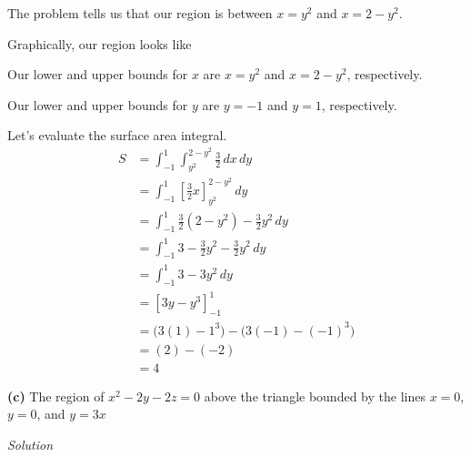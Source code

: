 \documentclass{article}
\newcommand{\lrp}[1]{\left( #1 \right)}
\newcommand{\lrb}[1]{\left[ #1 \right]}
\newcommand{\Solution}{\textit{Solution}}
\begin{document}
The problem tells us that our region is between $x=y^2$ and $x=2-y^2$.

Graphically, our region looks like \begin{center}
\end{center}

Our lower and upper bounds for $x$ are $x=y^2$ and $x=2-y^2$, respectively.

Our lower and upper bounds for $y$ are $y=-1$ and $y=1$, respectively.

Let's evaluate the surface area integral.
\begin{align*}
    S&=\int_{-1}^1\int_{y^2}^{2-y^2}\frac{3}{2}\,dx\,dy\\
    &=\int_{-1}^1\lrb{\frac{3}{2}x}_{y^2}^{2-y^2}\,dy\\
    &=\int_{-1}^1\frac{3}{2}\lrp{2-y^2}-\frac{3}{2}y^2\,dy\\
    &=\int_{-1}^1 3-\frac{3}{2}y^2-\frac{3}{2}y^2\,dy\\
    &=\int_{-1}^1 3-3y^2\,dy\\
    &=\lrb{3y-y^3}_{-1}^1\\
    &=\big(3(1)-1^3\big)-\big(3(-1)-(-1)^3\big)\\
    &=\lrp{2}-\lrp{-2}\\
    &=\boxed{4}
\end{align*}

{}\textbf{(c)} The region of $x^2-2y-2z=0$ above the triangle bounded by the lines $x=0$, $y=0$, and $y=3x$

\Solution
\end{document}
